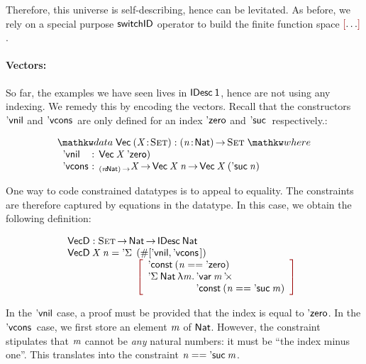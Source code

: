 Therefore, this universe is self-describing, hence can be
levitated. As before, we rely on a special purpose $\F{switchID}$
operator to build the finite function space $\bigRedBracket{\ldots}$.

\paragraph{Vectors:}

\newcommand{\VecD}{\C{VecD}}
\newcommand{\VecNil}{\etag{\CN{vnil}}}
\newcommand{\VecCons}[2]{\etag{\CN{vcons}}\:#1\:#2}

So far, the examples we have seen lives in $\IDesc{\Unit}$, hence are
not using any indexing. We remedy this by encoding the vectors. Recall
that the constructors $\VecNil$ and $\VecCons{\!}{\!}$ are only defined for an
index $\NatZero$ and $\NatSuc$ respectively.:

\[
\stk{
\data \D{Vec}\: \PITEL{\V{X}}{\Set} : \PI{\V{n}}{\Nat} \Set \where \\
\;\;\begin{array}{@{}l@{\::\:\:}l@{\quad}l}
    \VecNil          & \D{Vec}\:\V{X}\:{\NatZero)}   \\
    \VecCons{\!}{\!} & _{\PI{\V{n}}{\Nat}}\V{X} \To \D{Vec}\:{\V{X}}\:{\V{n}} \To \D{Vec}\:{\V{X}}\:{(\NatSuc{\V{n}})}
\end{array}
}
\]

One way to code constrained datatypes is to appeal to equality. The
constraints are therefore captured by equations in the datatype. In
this case, we obtain the following definition:

\[\stk{
\VecD : \Set \To \Nat \To \IDesc{\Nat} \\
\begin{array}{@{}ll}
\VecD\: \V{X}\: \V{n} = \DSigma{\!}{\!} \!\!\!\!& (\EnumT{[ \VecNil , \VecCons{\!}{\!} ]}) \\
                        & \bigRedBracket{
                          \begin{array}{l}
                            \DConst{(\V{n} \PropEq \NatZero)} \\
                            \DSigma{\Nat}{\LAM{\V{m}} \stk{\DProd{\DVar{\V{m}}}{\\\DConst{(\V{n} \PropEq \NatSuc{\V{m}})}}}}
                          \end{array}
                          }
\end{array}
}\]

In the $\VecNil$ case, a proof must be provided that the index is
equal to $\NatZero$. In the $\VecCons{\!}{\!}$ case, we first store an element
$\V{m}$ of $\Nat$. However, the constraint stipulates that $\V{m}$
cannot be \emph{any} natural numbers: it must be ``the index minus
one''. This translates into the constraint $\V{n} \PropEq
\NatSuc{\V{m}}$.


